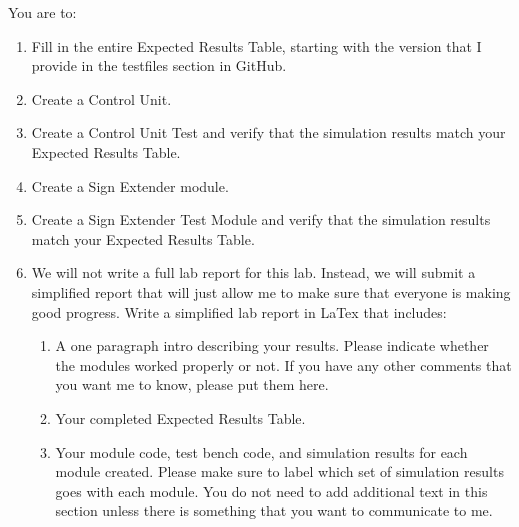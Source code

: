 You are to:
\begin{enumerate}
\item Fill in the entire Expected Results Table, starting with the version that I provide in the testfiles section in GitHub.
\item Create a Control Unit.
\item Create a Control Unit Test and verify that the simulation results match your Expected Results Table.
\item Create a Sign Extender module.
\item Create a Sign Extender Test Module and verify that the simulation results match your Expected Results Table.
\item We will not write a full lab report for this lab.  Instead, we will submit a simplified report that will just allow me to make sure that everyone is making good progress.  Write a simplified lab report in LaTex that includes:
\begin{enumerate}
	\item  A one paragraph intro describing your results.  Please indicate whether the modules worked properly or not.  If you have any other comments that you want me to know, please put them here.
	\item Your completed Expected Results Table.
	\item Your module code, test bench code, and simulation results for each module created.  Please make sure to label which set of simulation results goes with each module.  You do not need to add additional text in this section unless there is something that you want to communicate to me.
\end{enumerate} 
\end{enumerate} 